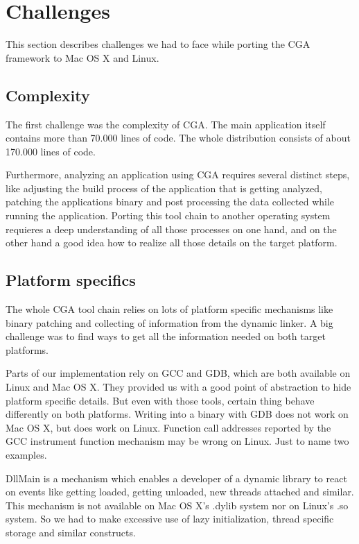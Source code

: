 \section{Challenges} This section describes challenges we had to face while porting the CGA framework to Mac OS X and Linux.

\subsection{Complexity} The first challenge was the complexity of CGA. The main application itself contains more than 70.000 lines of code. The whole distribution consists of about 170.000 lines of code. 

Furthermore, analyzing an application using CGA requires several distinct steps, like adjusting the build process of the application that is getting analyzed, patching the applications binary and post processing the data collected while running the application. Porting this tool chain to another operating system requieres a deep understanding of all those processes on one hand, and on the other hand a good idea how to realize all those details on the target platform.

\subsection{Platform specifics} The whole CGA tool chain relies on lots of platform specific mechanisms like binary patching and collecting of information from the dynamic linker. A big challenge was to find ways to get all the information needed on both target platforms. 

Parts of our implementation rely on GCC and GDB, which are both available on Linux and Mac OS X. They provided us with a good point of abstraction to hide platform specific details. But even with those tools, certain thing behave differently on both platforms. Writing into a binary with GDB does not work on Mac OS X, but does work on Linux. Function call addresses reported by the GCC instrument function mechanism may be wrong on Linux. Just to name two examples. 

DllMain is a mechanism which enables a developer of a dynamic library to react on events like getting loaded, getting unloaded, new threads attached and similar. This mechanism is not available on Mac OS X's .dylib system nor on Linux's .so system. So we had to make excessive use of lazy initialization, thread specific storage and similar constructs.

